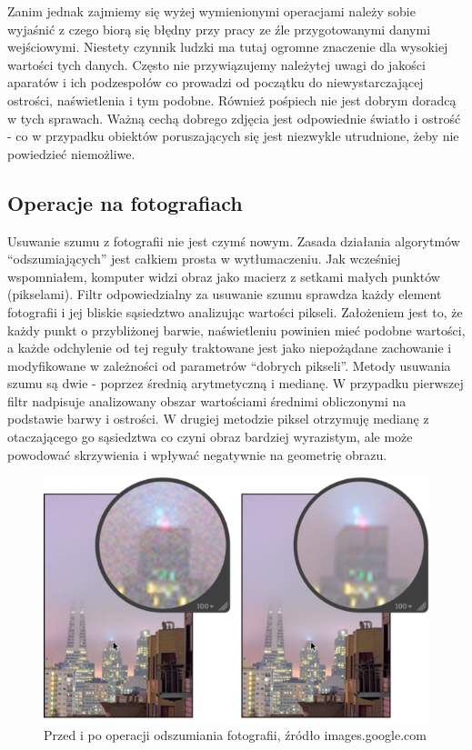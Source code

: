 \documentclass{article}
\begin{document}
	Zanim jednak zajmiemy się wyżej wymienionymi operacjami należy sobie wyjaśnić z czego biorą się błędny przy pracy ze źle przygotowanymi danymi wejściowymi. Niestety czynnik ludzki ma tutaj ogromne znaczenie dla wysokiej wartości tych danych. Często nie przywiązujemy należytej uwagi do jakości aparatów i ich podzespołów co prowadzi od początku do niewystarczającej ostrości, naświetlenia i tym podobne. Również pośpiech nie jest dobrym doradcą w tych sprawach. Ważną cechą dobrego zdjęcia jest odpowiednie światło i ostrość - co w przypadku obiektów poruszających się jest niezwykle utrudnione, żeby nie powiedzieć niemożliwe. 
	\subsection{Operacje na fotografiach}
	Usuwanie szumu z fotografii nie jest czymś nowym. Zasada działania algorytmów “odszumiających” jest całkiem prosta w wytłumaczeniu. Jak wcześniej wspomniałem, komputer widzi obraz jako macierz z setkami małych punktów (pikselami). Filtr odpowiedzialny za usuwanie szumu sprawdza każdy element fotografii i jej bliskie sąsiedztwo analizując wartości pikseli. Założeniem jest to, że każdy punkt o przybliżonej barwie, naświetleniu powinien mieć podobne wartości, a każde odchylenie od tej reguły traktowane jest jako niepożądane zachowanie i modyfikowane w zależności od parametrów “dobrych pikseli”. Metody usuwania szumu są dwie - poprzez średnią arytmetyczną i medianę. W przypadku pierwszej filtr nadpisuje analizowany obszar wartościami średnimi obliczonymi na podstawie barwy i ostrości. W drugiej metodzie piksel otrzymuję medianę z otaczającego go sąsiedztwa co czyni obraz bardziej wyrazistym, ale może powodować skrzywienia i wpływać negatywnie na geometrię obrazu.
	\begin{figure}
		\centering
		\includegraphics[width=15cm]{szum}
		\caption{Przed i po operacji odszumiania fotografii, źródło images.google.com}
	\end{figure}
\end{document}
